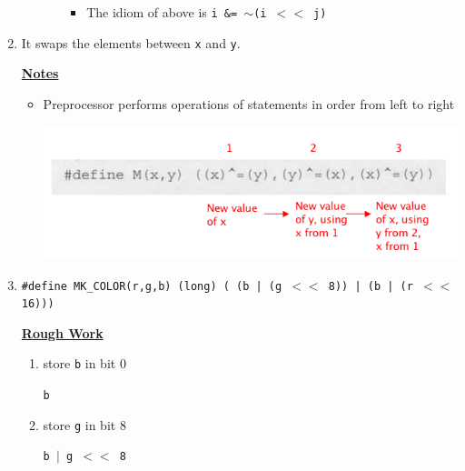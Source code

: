 \documentclass[12pt]{article}
\begin{document}
\begin{enumerate}[1.]
\begin{enumerate}[a)]
\begin{itemize}
\begin{itemize}
                \item The idiom of above is \texttt{i \&= $\sim$(i $<<$ j)}
            \end{itemize}
        \end{itemize}

    \end{enumerate}

    \item It swaps the elements between \texttt{x} and \texttt{y}.

    \underline{\textbf{Notes}}

    \begin{itemize}
        \item Preprocessor performs operations of statements in order from left to right

        \begin{center}
        \includegraphics[width=\linewidth]{images/review_9_solution_6.png}
        \end{center}
    \end{itemize}

    \item

    \texttt{\#define MK\_COLOR(r,g,b) (long) ( (b | (g $<<$ 8)) | (b | (r $<<$ 16)))}

    \bigskip

    \underline{\textbf{Rough Work}}

    \begin{enumerate}[1.]

        \item store \texttt{b} in bit 0

        \bigskip

        \texttt{b}

        \bigskip

        \item store \texttt{g} in bit 8

        \bigskip

        \texttt{b $\lvert$ g $<<$ 8}

        \bigskip


\end{enumerate}
\end{enumerate}
\end{document}
